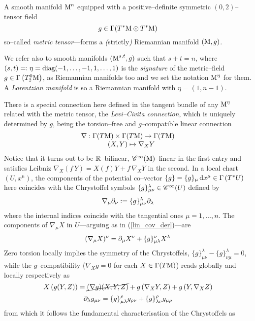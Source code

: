 \begin{defi}
    A smooth manifold $\text{\normalfont M}^n$ equipped with a positive--definite symmetric $(0,2)$--tensor field
$$g\in\Gamma(T^*\M\odot T^*\M)%
$$
so--called \emph{metric tensor}---forms a \emph{(}strictly\emph{)} Riemannian manifold $(\text{\normalfont M},g)$. 
\end{defi}


\begin{note}
We refer also to smooth manifolds $(\text{\normalfont M}^{s,t},g)$ such that $s+t=n$, where $(s,t)=:\eta=\text{\normalfont diag}(-1,\hdots,-1,1,\hdots,1)$ is the \emph{signature} of the metric--field $g\in\Gamma\left(T^0_2\text{\normalfont M}\right)$, as Riemannian manifolds too and we set the notation $\text{\normalfont M}^\eta$ for them. A \emph{Lorentzian manifold} is so a Riemannian manifold with $\eta=(1,n-1).$
\end{note}

There is a special connection here defined in the tangent bundle of any $\text{\normalfont M}^\eta$ related with the metric tensor, the \emph{Levi--Civita connection}, which is uniquely determined by $g$, being the torsion--free and $g$--compatible linear connection
$$\begin{matrix}
    \nabla:\Gamma(T\text{\normalfont M})\times\Gamma(T\text{\normalfont M})\to\Gamma(T\text{\normalfont M})\\
    \quad(X,Y)\mapsto\nabla_XY
\end{matrix}$$
Notice that it turns out to be $\mathbb{R}$--bilinear, $\mathscr{C}^\infty(\text{\normalfont M})$--linear in the first entry and satisfies Leibniz $\nabla_X(f\,Y)=X(f)Y+f\,\nabla_XY$ in the second. In a local chart $(U,x^\mu)$, the components of the potential co--vector $\{g\}=\{g\}_\mu\,\text{\normalfont d} x^\mu\in\Gamma\left(T^*U\right)$ here coincides with the Chrystoffel symbols $\{g\}^\lambda_{\mu\nu}\in\mathscr{C}^\infty(U)$ defined by
$$\nabla_\mu\partial_\nu:=\{g\}^\lambda_{\mu\nu}\partial_\lambda$$
where the internal indices coincide with the tangential ones $\mu=1,\hdots,n$. The components of $\nabla_\mu X$ in $U$---arguing as in (\ref{lin_cov_der})---are
$$(\nabla_\mu X)^\nu=\partial_\mu X^\nu+\{g\}^\nu_{\mu\lambda}X^\lambda$$
Zero torsion locally implies the symmetry of the Chrystoffels, $\{g\}^\lambda_{\mu\nu}-\{g\}_{\nu\mu}^\lambda=0$, while the $g$--compatibility ($\nabla_Xg=0$ for each $X\in\Gamma(T\text{\normalfont M})$) reads globally and locally respectively as
$$X\left(g(Y,Z)\right)=\cancel{(\nabla g)(X,Y,Z)}+g\left(\nabla_XY,Z\right)+g\left(Y,\nabla_XZ\right)$$
$$\partial_\lambda g_{\mu\nu}=\{g\}_{\mu\lambda}^\rho g_{\rho\nu}+\{g\}_{\lambda\nu}^\rho g_{\mu\rho}$$
from which it follows the fundamental characterisation of the Chrystoffels as

